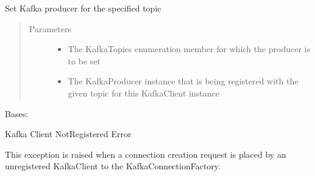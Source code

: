 \documentclass[letterpaper,10pt,english]{sphinxmanual}
\begin{document}
\begin{fulllineitems}
\begin{fulllineitems}
\end{fulllineitems}


\begin{fulllineitems}
\label{\detokenize{Forge:Forge.KafkaClient.set_producer}}
\sphinxAtStartPar
Set Kafka producer for the specified topic
\begin{quote}\begin{description}
\item[{Parameters}] \leavevmode\begin{itemize}
\item {} 
\sphinxAtStartPar
{} \textendash{} The KafkaTopics enumeration member for which the producer is to be set

\item {} 
\sphinxAtStartPar
{} \textendash{} The KafkaProducer instance that is being registered with the given topic for this KafkaClient
instance

\end{itemize}

\end{description}\end{quote}

\end{fulllineitems}


\end{fulllineitems}


\begin{fulllineitems}
\label{\detokenize{Forge:Forge.KafkaClientNotRegisteredError}}
\sphinxAtStartPar
Bases: 

\sphinxAtStartPar
Kafka Client Not\sphinxhyphen{}Registered Error

\sphinxAtStartPar
This exception is raised when a connection creation request is placed by an unregistered KafkaClient to the
KafkaConnectionFactory.

\end{fulllineitems}
\end{document}
